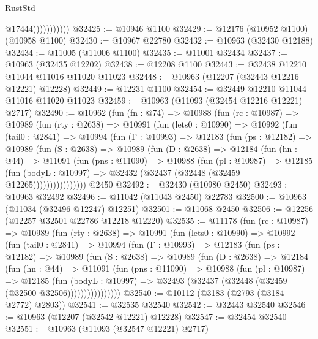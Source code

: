\begin{lexlean}{RustStd}
\begin{coremodule}
                          @17444)))))))))))
@32425 := @10946 @1100
@32429 := @12176 (@10952 @1100) (@10958 @1100)
@32430 := @10967 @22780
@32432 := @10963 (@32430 @12188)
@32434 := @11005 (@11006 @1100)
@32435 := @11001 @32434
@32437 := @10963 (@32435 @12202)
@32438 := @12208 @1100
@32443 := @32438 @12210 @11044 @11016 @11020 @11023
@32448 := @10963 (@12207 (@32443 @12216 @12221) @12228)
@32449 := @12231 @1100
@32454 := @32449 @12210 @11044 @11016 @11020 @11023
@32459 := @10963 (@11093 (@32454 @12216 @12221) @2717)
@32490 := @10962
    (fun (fn : @74) =>
    @10988
      (fun (rc : @10987) =>
      @10989
        (fun (rty : @2638) =>
        @10991
          (fun (lets0 : @10990) =>
          @10992
            (fun (tail0 : @2841) =>
            @10994
              (fun (Γ : @10993) =>
              @12183
                (fun (ps : @12182) =>
                @10989
                  (fun (S : @2638) =>
                  @10989
                    (fun (D : @2638) =>
                    @12184
                      (fun (hn : @44) =>
                      @11091
                        (fun (pns : @11090) =>
                        @10988
                          (fun (pl : @10987) =>
                          @12185
                            (fun (bodyL : @10997) =>
                            @32432 (@32437 (@32448 (@32459 @12265))))))))))))))))
    @2450
@32492 := @32430 (@10980 @2450)
@32493 := @10963 @32492
@32496 := @11042 (@11043 @2450) @22783
@32500 := @10963 (@11034 (@32496 @12247) @12251)
@32501 := @11068 @2450
@32506 := @12256 (@12257 @32501 @22786 @12218 @12220)
@32535 := @11178
    (fun (rc : @10987) =>
    @10989
      (fun (rty : @2638) =>
      @10991
        (fun (lets0 : @10990) =>
        @10992
          (fun (tail0 : @2841) =>
          @10994
            (fun (Γ : @10993) =>
            @12183
              (fun (ps : @12182) =>
              @10989
                (fun (S : @2638) =>
                @10989
                  (fun (D : @2638) =>
                  @12184
                    (fun (hn : @44) =>
                    @11091
                      (fun (pns : @11090) =>
                      @10988
                        (fun (pl : @10987) =>
                        @12185
                          (fun (bodyL : @10997) =>
                          @32493 (@32437 (@32448 (@32459 (@32500 @32506))))))))))))))))
@32540 := @10112 (@3183 (@2793 (@3184 @2772) @2803))
@32541 := @32535 @32540
@32542 := @32443 @32540
@32546 := @10963 (@12207 (@32542 @12221) @12228)
@32547 := @32454 @32540
@32551 := @10963 (@11093 (@32547 @12221) @2717)

\end{coremodule}
\end{lexlean}
